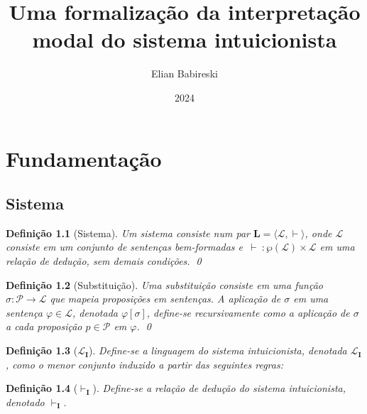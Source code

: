 \documentclass{report}
\newtheorem{definition}{Definição}
\begin{document}
    \title{Uma formalização da interpretação modal do sistema intuicionista}
    \author{Elian Babireski}
    \date{2024}

    \maketitle

    \tableofcontents

    
    

    \chapter{Fundamentação}

    \section{Sistema}

    \begin{definition}[Sistema]
        Um sistema consiste num par $\mathbf{L} = \langle \mathcal{L}, \vdash\rangle$, onde $\mathcal{L}$ consiste em um conjunto de sentenças bem-formadas e $\, \vdash \: : \wp(\mathcal{L}) \times \mathcal{L} $ em uma relação de dedução, sem demais condições.
        \qed
    \end{definition}

    \begin{definition}[Substituição]
        Uma substituição consiste em uma função $\sigma : \mathcal{P} \to \mathcal{L}$ que mapeia proposições em sentenças. A aplicação de $\sigma$ em uma sentença $\varphi \in \mathcal{L}$, denotada $\varphi[\sigma]$, define-se recursivamente como a aplicação de $\sigma$ a cada proposição $p \in \mathcal{P}$ em $\varphi$.
        \qed
    \end{definition}    

    \begin{definition}[$\mathcal{L}_\mathbf{I}$]
        Define-se a linguagem do sistema intuicionista, denotada $\mathcal{L}_\mathbf{I}$, como o menor conjunto induzido a partir das seguintes regras:
    \end{definition}

    \begin{definition}[$\vdash_\mathbf{I}$]
        Define-se a relação de dedução do sistema intuicionista, denotado $\vdash_\mathbf{I}$.
    \end{definition}
\end{document}
